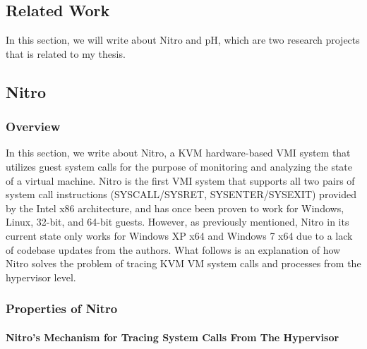 \documentclass{report}
\begin{document}
\begin{spacing}{1.5}
\chapter{Related Work}

{\large
In this section, we will write about Nitro and pH, which are two research projects that is related to my thesis. 
\newline
}

\section{Nitro}

\subsection{Overview}

{\large
In this section, we write about Nitro, a KVM hardware-based VMI system that utilizes guest system calls for the purpose of monitoring and analyzing the state of a virtual machine. Nitro is the first VMI system that supports all two pairs of system call instructions (SYSCALL/SYSRET, SYSENTER/SYSEXIT) provided by the Intel x86 architecture, and has once been proven to work for Windows, Linux, 32-bit, and 64-bit guests. However, as previously mentioned, Nitro in its current state only works for Windows XP x64 and Windows 7 x64 due to a lack of codebase updates from the authors. What follows is an explanation of how Nitro solves the problem of tracing KVM VM system calls and processes from the hypervisor level.
\newline
}



\subsection{Properties of Nitro}


\subsubsection{Nitro's Mechanism for Tracing System Calls From The Hypervisor}


\end{spacing}
\end{document}
